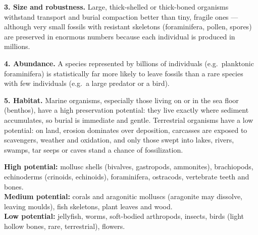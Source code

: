\documentclass[11pt]{article}
\newcommand{\cle}[1]{{\popxbold\color{popdark}#1}}
\begin{document}
\textbf{3. Size and robustness.} Large, thick-shelled or thick-boned organisms withstand transport and burial compaction better than tiny, fragile ones --- although very small fossils with resistant skeletons (foraminifera, pollen, spores) are preserved in enormous numbers because each individual is produced in millions.

\textbf{4. Abundance.} A species represented by billions of individuals (e.g.\ planktonic foraminifera) is statistically far more likely to leave fossils than a rare species with few individuals (e.g.\ a large predator or a bird).

\textbf{5. Habitat.} \cle{Marine} organisms, especially those living on or in the sea floor (benthos), have a high preservation potential: they live exactly where sediment accumulates, so burial is immediate and gentle. \cle{Terrestrial} organisms have a low potential: on land, erosion dominates over deposition, carcasses are exposed to scavengers, weather and oxidation, and only those swept into lakes, rivers, swamps, tar seeps or caves stand a chance of fossilization.

\begin{exemplebox}
\textbf{High potential:} mollusc shells (bivalves, gastropods, ammonites), brachiopods, echinoderms (crinoids, echinoids), foraminifera, ostracods, vertebrate teeth and bones.\\
\textbf{Medium potential:} corals and aragonitic molluscs (aragonite may dissolve, leaving moulds), fish skeletons, plant leaves and wood.\\
\textbf{Low potential:} jellyfish, worms, soft-bodied arthropods, insects, birds (light hollow bones, rare, terrestrial), flowers.
\end{exemplebox}
\end{document}
